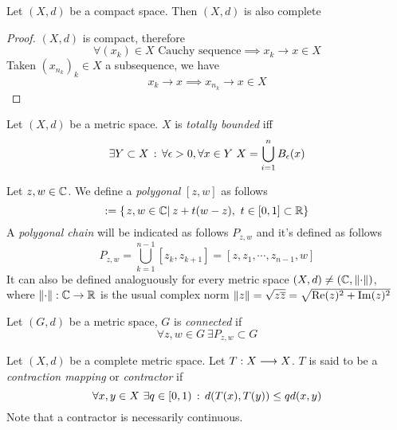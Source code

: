 \documentclass[../complete.tex]{subfiles}
\begin{document}
\begin{thm}
	Let $(X,d)$ be a compact space. Then $(X,d)$ is also complete
\end{thm}
\begin{proof}
	$(X,d)$ is compact, therefore
	\begin{equation*}
		\forall(x_k)\in X\text{ Cauchy sequence}\implies x_k\to x\in X
	\end{equation*}
	Taken $(x_{n_k})_k\in X$ a subsequence, we have
	\begin{equation*}
		x_{k}\to x\implies x_{n_k}\to x\in X
	\end{equation*}
\end{proof}
\begin{dfn}
	Let $(X,d)$ be a metric space. $X$ is \textit{totally bounded} iff
	\begin{equation*}
		\exists Y\subset X\st\forall\epsilon>0,\forall x\in Y\ X=\bigcup_{i=1}^nB_\epsilon(x)
	\end{equation*}
\end{dfn}
\begin{dfn}
	Let $z,w\in\mathbb{C}$. We define a \textit{polygonal} $[z,w]$ as follows
	\begin{equation*}
		[z,w]:=\{\derin{z,w\in\Cf}z+t(w-z),\ t\in[0,1]\subset\R\}
	\end{equation*}
	A \textit{polygonal chain} will be indicated as follows $P_{z,w}$ and it's defined as follows
	\begin{equation*}
		P_{z,w}=\bigcup_{k=1}^{n-1}[z_k,z_{k+1}]=[z,z_1,\cdots,z_{n-1},w]
	\end{equation*}
	It can also be defined analoguously for every metric space $(X,d)\ne(\mathbb{C},\norm{\cdot})$, where $\norm{\cdot}:\mathbb{C}\to\mathbb{R}$ is the usual complex norm $\norm{z}=\sqrt{z\overline{z}}=\sqrt{\Re(z)^2+\Im(z)^2}$
\end{dfn}
\begin{dfn}
	Let $(G,d)$ be a metric space, $G$ is \textit{connected} if
	\begin{equation*}
		\forall z,w\in G\ \exists P_{z,w}\subset G
	\end{equation*}
\end{dfn}
\begin{dfn}
	Let $(X,d)$ be a complete metric space. Let $T:X\overset{}{\longrightarrow} X$. $T$ is said to be a \textit{contraction mapping} or \textit{contractor} if
	\begin{equation}
		\forall x,y\in X\ \exists q\in[0,1)\, :\,  d(T(x),T(y))\le qd(x,y)
		\label{eq:contractor}
	\end{equation}
	Note that a contractor is necessarily continuous.
\end{dfn}
\end{document}
